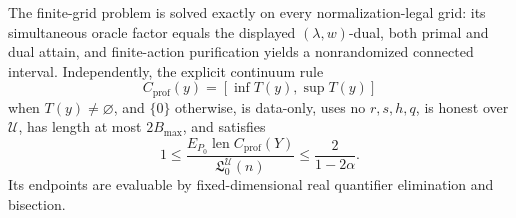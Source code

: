 The finite-grid problem is solved exactly on every normalization-legal grid: its simultaneous oracle factor equals the displayed \((\lambda,w)\)-dual, both primal and dual attain, and finite-action purification yields a nonrandomized connected interval.  Independently, the explicit continuum rule
\[
 C_{\mathrm{prof}}(y)=[\inf T(y),\sup T(y)]
\]
when \(T(y)\neq\varnothing\), and \(\{0\}\) otherwise, is data-only, uses no \(r,s,h,q\), is honest over \(\mathcal U\), has length at most \(2B_{\max}\), and satisfies
\[
 1\leq\frac{E_{P_0}\operatorname{len}C_{\mathrm{prof}}(Y)}
 {\mathfrak L_0^{\mathcal U}(n)}\leq\frac{2}{1-2\alpha}.
\]
Its endpoints are evaluable by fixed-dimensional real quantifier elimination and bisection.